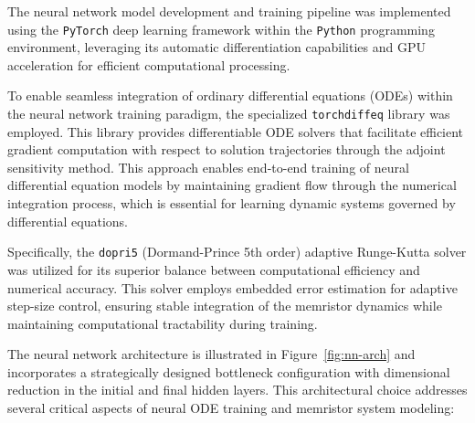 \documentclass[11pt, oneside]{article}
\begin{document}
The neural network model development and training pipeline was implemented using the \texttt{PyTorch} deep learning framework within the \texttt{Python} programming environment, leveraging its automatic differentiation capabilities and GPU acceleration for efficient computational processing.


To enable seamless integration of ordinary differential equations (ODEs) within the neural network training paradigm, the specialized \texttt{torchdiffeq} library was employed. This library provides differentiable ODE solvers that facilitate efficient gradient computation with respect to solution trajectories through the adjoint sensitivity method. This approach enables end-to-end training of neural differential equation models by maintaining gradient flow through the numerical integration process, which is essential for learning dynamic systems governed by differential equations.

Specifically, the \texttt{dopri5} (Dormand-Prince 5th order) adaptive Runge-Kutta solver was utilized for its superior balance between computational efficiency and numerical accuracy. This solver employs embedded error estimation for adaptive step-size control, ensuring stable integration of the memristor dynamics while maintaining computational tractability during training.


The neural network architecture is illustrated in Figure~\ref{fig:nn-arch} and incorporates a strategically designed bottleneck configuration with dimensional reduction in the initial and final hidden layers. This architectural choice addresses several critical aspects of neural ODE training and memristor system modeling:
\end{document}
